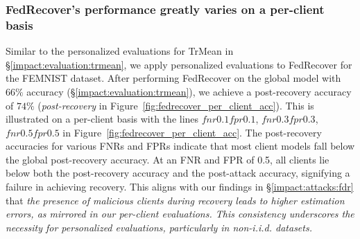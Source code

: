 \subsubsection{FedRecover's performance greatly varies on a per-client basis}\label{impact:evaluation:fdr}
Similar to the personalized evaluations for TrMean in \S\ref{impact:evaluation:trmean}, we apply personalized evaluations to FedRecover for the FEMNIST dataset. After performing FedRecover on the global model with $66\%$ accuracy (\S\ref{impact:evaluation:trmean}), we achieve a post-recovery accuracy of $74\%$ (\emph{post-recovery} in Figure~\ref{fig:fedrecover_per_client_acc}). This is illustrated on a per-client basis with the lines \emph{$fnr0.1fpr0.1$}, \emph{$fnr0.3fpr0.3$}, \emph{$fnr0.5fpr0.5$} in Figure~\ref{fig:fedrecover_per_client_acc}. The post-recovery accuracies for various FNRs and FPRs indicate that most client models fall below the global post-recovery accuracy. At an FNR and FPR of 0.5, all clients lie below both the post-recovery accuracy and the post-attack accuracy, signifying a failure in achieving recovery. This aligns with our findings in \S\ref{impact:attacks:fdr} that \emph{the presence of malicious clients during recovery leads to higher estimation errors, as mirrored in our per-client evaluations. This consistency underscores the necessity for personalized evaluations, particularly in non-i.i.d. datasets.}

